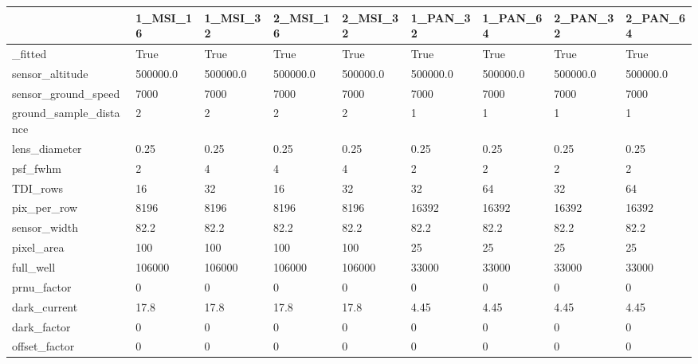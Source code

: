 \begin{tabular}{lllllllll}
\toprule
{} &  1\_MSI\_16 &  1\_MSI\_32 &  2\_MSI\_16 &  2\_MSI\_32 &  1\_PAN\_32 &  1\_PAN\_64 &  2\_PAN\_32 &  2\_PAN\_64 \\
\midrule
\_fitted                &      True &      True &      True &      True &      True &      True &      True &      True \\
sensor\_altitude        &  500000.0 &  500000.0 &  500000.0 &  500000.0 &  500000.0 &  500000.0 &  500000.0 &  500000.0 \\
sensor\_ground\_speed    &      7000 &      7000 &      7000 &      7000 &      7000 &      7000 &      7000 &      7000 \\
ground\_sample\_distance &         2 &         2 &         2 &         2 &         1 &         1 &         1 &         1 \\
lens\_diameter          &      0.25 &      0.25 &      0.25 &      0.25 &      0.25 &      0.25 &      0.25 &      0.25 \\
psf\_fwhm               &         2 &         4 &         4 &         4 &         2 &         2 &         2 &         2 \\
TDI\_rows               &        16 &        32 &        16 &        32 &        32 &        64 &        32 &        64 \\
pix\_per\_row            &      8196 &      8196 &      8196 &      8196 &     16392 &     16392 &     16392 &     16392 \\
sensor\_width           &      82.2 &      82.2 &      82.2 &      82.2 &      82.2 &      82.2 &      82.2 &      82.2 \\
pixel\_area             &       100 &       100 &       100 &       100 &        25 &        25 &        25 &        25 \\
full\_well              &    106000 &    106000 &    106000 &    106000 &     33000 &     33000 &     33000 &     33000 \\
prnu\_factor            &         0 &         0 &         0 &         0 &         0 &         0 &         0 &         0 \\
dark\_current           &      17.8 &      17.8 &      17.8 &      17.8 &      4.45 &      4.45 &      4.45 &      4.45 \\
dark\_factor            &         0 &         0 &         0 &         0 &         0 &         0 &         0 &         0 \\
offset\_factor          &         0 &         0 &         0 &         0 &         0 &         0 &         0 &         0 \\

\end{tabular}
